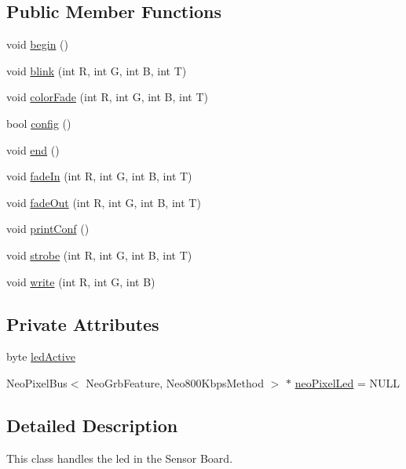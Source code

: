\subsection*{Public Member Functions}
\begin{DoxyCompactItemize}
\item 
void \hyperlink{classCoolBoardLed_ae3cbde8affcc6f011cbd698c8ef911f6}{begin} ()
\item 
void \hyperlink{classCoolBoardLed_a27706bc029f6a126c55d0b91624ad7fa}{blink} (int R, int G, int B, int T)
\item 
void \hyperlink{classCoolBoardLed_a6dbfe23988f43e1242cd05e69b13ff30}{color\+Fade} (int R, int G, int B, int T)
\item 
bool \hyperlink{classCoolBoardLed_a1b60e5e30bea96c49ed62ed1bf1ffc8b}{config} ()
\item 
void \hyperlink{classCoolBoardLed_a69f323359e0c9f797422f2152b5d41ef}{end} ()
\item 
void \hyperlink{classCoolBoardLed_aec915442a8441c7cd45c3279d3ff8821}{fade\+In} (int R, int G, int B, int T)
\item 
void \hyperlink{classCoolBoardLed_a27c4e14fa2cd3639c0844152cea98887}{fade\+Out} (int R, int G, int B, int T)
\item 
void \hyperlink{classCoolBoardLed_a8ed3053a36f0ed4a131f43b5b17efb61}{print\+Conf} ()
\item 
void \hyperlink{classCoolBoardLed_adc08c0ac07473499971c503d300f0413}{strobe} (int R, int G, int B, int T)
\item 
void \hyperlink{classCoolBoardLed_a30fadd4cbec17ceea428bf7a32207e87}{write} (int R, int G, int B)
\end{DoxyCompactItemize}
\subsection*{Private Attributes}
\begin{DoxyCompactItemize}
\item 
byte \hyperlink{classCoolBoardLed_a5f17c135516fcf4b44ea8a096ba0177a}{led\+Active}
\item 
Neo\+Pixel\+Bus$<$ Neo\+Grb\+Feature, Neo800\+Kbps\+Method $>$ $\ast$ \hyperlink{classCoolBoardLed_ac2c13fa462a010cd9242bf297c013923}{neo\+Pixel\+Led} = N\+U\+LL
\end{DoxyCompactItemize}


\subsection{Detailed Description}
This class handles the led in the Sensor Board. 


